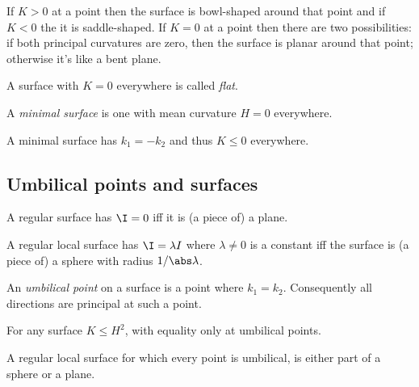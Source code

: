 \documentclass{article}
\begin{document}
\begin{corollary}[Notes 9.12]
    If $K>0$ at a point then the surface is bowl-shaped around that point and if $K<0$ the it is
    saddle-shaped. If $K=0$ at a point then there are two possibilities: if both principal
    curvatures are zero, then the surface is planar around that point; otherwise it's like 
    a bent plane.
\end{corollary}

\begin{definition}
    A surface with $K=0$ everywhere is called \emph{flat}.
\end{definition}

\begin{definition}
    A \emph{minimal surface} is one with mean curvature $H=0$ everywhere.
\end{definition}

\begin{lemma}
    A minimal surface has $k_1=-k_2$ and thus $K \leq 0$ everywhere.
\end{lemma}

\subsection{Umbilical points and surfaces}

\begin{theorem}[Notes 9.19]
    A regular surface has $\I=0$ iff it is (a piece of) a plane.
\end{theorem}

\begin{theorem}[Notes 9.20]
    A regular local surface has $\I = \lambda I$ where $\lambda \not=0$ is a constant iff 
    the surface is (a piece of) a sphere with radius $1/\abs\lambda$.
\end{theorem}

\begin{definition}
    An \emph{umbilical point} on a surface is a point where $k_1=k_2$. Consequently all 
    directions are principal at such a point.
\end{definition}

\begin{lemma}[Notes 9.22]
    For any surface $K\leq H^2$, with equality only at umbilical points.
\end{lemma}

\begin{theorem}[Notes 9.23]
    A regular local surface for which every point is umbilical, is either part of a sphere 
    or a plane.
\end{theorem}
\end{document}
